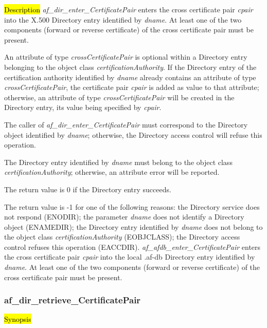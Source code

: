 \hl{Description}
{\em af\_dir\_enter\_CertificatePair} enters the cross certificate pair {\em cpair} 
into the X.500 Directory entry identified by {\em dname}. At least one of the two components 
(forward or reverse certificate) of the cross certificate pair must be present.

An attribute of type {\em crossCertificatePair} is optional within a Directory entry
belonging to the object class {\em certificationAuthority}. If the Directory entry of
the certification authority identified by {\em dname} already contains an attribute of
type {\em crossCertificatePair}, the certificate pair {\em cpair} is added as value
to that attribute; otherwise, an attribute of type {\em crossCertificatePair} will be
created in the Directory entry, its value being specified by {\em cpair}.

The caller of {\em af\_dir\_enter\_CertificatePair} must correspond to the Directory
object identified by {\em dname}; otherwise, the Directory access control will refuse 
this operation.

The Directory entry identified by {\em dname} must belong to the object class
{\em certificationAuthority}; otherwise, an attribute error will be reported.

The return value is 0 if the Directory entry succeeds.

The return value is -1 for one of the following reasons:
\bi
\m the Directory service does not respond (ENODIR);
\m the parameter {\em dname} does not identify a Directory object (ENAMEDIR);
\m the Directory entry identified by {\em dname} does not belong to the object class
{\em certificationAuthority} (EOBJCLASS);
\m the Directory access control refuses this operation (EACCDIR).
\ei
{\em af\_afdb\_enter\_CertificatePair} enters the cross certificate pair {\em cpair} 
into the local .af-db Directory entry identified by {\em dname}. At least one of the two components 
(forward or reverse certificate) of the cross certificate pair must be present.



\subsubsection{af\_dir\_retrieve\_CertificatePair}

\hl{Synopsis}

